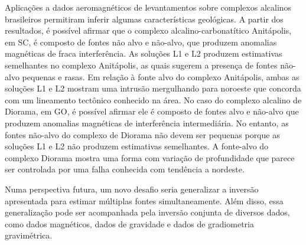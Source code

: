 Aplicações a dados aeromagnéticos de levantamentos sobre complexos alcalinos brasileiros permitiram inferir algumas características geológicas.
A partir dos resultados, é possível afirmar que o complexo alcalino-carbonatítico Anitápolis, em SC, é composto de fontes não alvo e não-alvo, que produzem anomalias magnéticas de fraca interferência.
As soluções L1 e L2 produzem estimativas semelhantes no complexo Anitápolis, as quais sugerem a presença de fontes não-alvo pequenas e rasas.
Em relação à fonte alvo do complexo Anitápolis, ambas as soluções L1 e L2 mostram uma intrusão mergulhando para noroeste que concorda com um lineamento tectônico conhecido na área.
No caso do complexo alcalino de Diorama, em GO, é possível afirmar ele é composto de fontes alvo e não-alvo que produzem anomalias magnéticas de interferência intermediária.
No entanto, as fontes não-alvo do complexo de Diorama não devem ser pequenas porque as soluções L1 e L2 não produzem estimativas semelhantes.
A fonte-alvo do complexo Diorama mostra uma forma com variação de profundidade que parece ser controlada por uma falha conhecida com tendência a nordeste.

Numa perspectiva futura, um novo desafio seria generalizar a inversão apresentada para estimar múltiplas fontes simultaneamente.
Além disso, essa generalização pode ser acompanhada pela inversão conjunta de diversos dados, como dados magnéticos, dados de gravidade e dados de gradiometria gravimétrica.